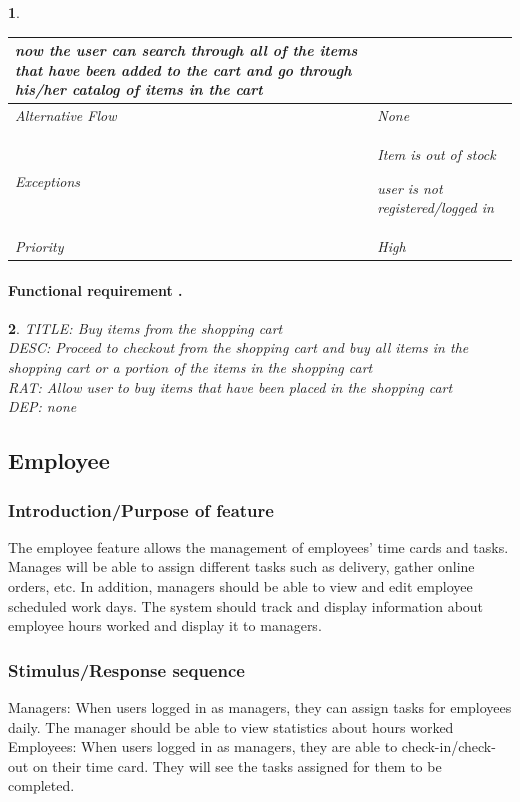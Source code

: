 \documentclass{scrreprt}
\theoremstyle{funreq}
\newtheorem{funreq}{}
\begin{document}
\begin{funreq}
\begin{table}[h!]
{\begin{tabularx}{\columnwidth}{|l|X|}
					now the user can search through all of the items that have been added to the cart and go through his/her catalog of items in the cart \\ \hline
					Alternative Flow & None                                       \\ \hline
					Exceptions       & Item is out of stock
					
					user is not registered/logged in \\ \hline
					Priority         & High                                       \\ \hline
				\end{tabularx}%
			}
		\end{table}
	\end{funreq}
	
	\paragraph[]{Functional requirement .}
	\begin{funreq}
		\label{account_login}
		TITLE: Buy items from the shopping cart\\
		DESC: Proceed to checkout from the shopping cart and buy all items in the shopping cart or a portion of the items in the shopping cart\\
		RAT: Allow user to buy items that have been placed in the shopping cart\\
		DEP: none
	\end{funreq}
	
	
	\subsection{Employee}
	\subsubsection{Introduction/Purpose of feature}
	The employee feature allows the management of employees’ time cards and tasks. Manages will be able to assign different tasks such as delivery, gather online orders, etc.  In addition, managers should be able to view and edit employee scheduled work days.  The system should track and display information about employee hours worked and display it to managers.
	
	
	\subsubsection{Stimulus/Response sequence}
	Managers:
	When users logged in as managers, they can assign tasks for employees daily.  The manager should be able to view statistics about hours worked
	Employees:
	When users logged in as managers, they are able to check-in/check-out on their time card. They will see the tasks assigned for them to be completed.
	
\end{document}
